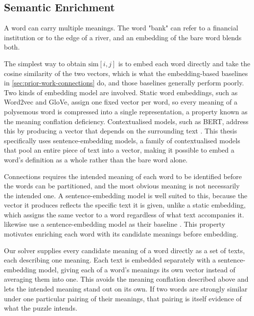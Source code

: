 \subsection{Semantic Enrichment}
\label{subsec:semantic-enrichment}

A word can carry multiple meanings. The word "bank" can refer to a financial institution or to the edge of a river, and an embedding of the bare word blends both.

The simplest way to obtain $\text{sim}[i,j]$ is to embed each word directly and take the cosine similarity of the two vectors, which is what the embedding-based baselines in \autoref{sec:prior-work-connections} do, and those baselines generally perform poorly. Two kinds of embedding model are involved. Static word embeddings, such as Word2vec and GloVe, assign one fixed vector per word, so every meaning of a polysemous word is compressed into a single representation, a property known as the meaning conflation deficiency. Contextualised models, such as BERT, address this by producing a vector that depends on the surrounding text \cite{camacho-colladosWordSenseEmbeddings2018}. This thesis specifically uses sentence-embedding models, a family of contextualised models that pool an entire piece of text into a vector, making it possible to embed a word's definition as a whole rather than the bare word alone.

Connections requires the intended meaning of each word to be identified before the words can be partitioned, and the most obvious meaning is not necessarily the intended one. A sentence-embedding model is well suited to this, because the vector it produces reflects the specific text it is given, unlike a static embedding, which assigns the same vector to a word regardless of what text accompanies it. \citeauthor{toddMissedConnectionsLateral2024} likewise use a sentence-embedding model as their baseline \cite{toddMissedConnectionsLateral2024}. This property motivates enriching each word with its candidate meanings before embedding.

Our solver supplies every candidate meaning of a word directly as a set of texts, each describing one meaning. Each text is embedded separately with a sentence-embedding model, giving each of a word's meanings its own vector instead of averaging them into one. This avoids the meaning conflation described above and lets the intended meaning stand out on its own. If two words are strongly similar under one particular pairing of their meanings, that pairing is itself evidence of what the puzzle intends.

